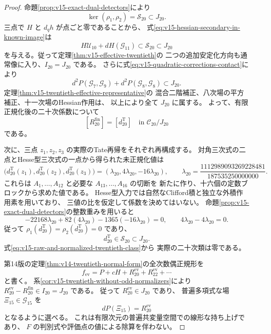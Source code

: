 \documentclass[a4paper,11pt]{ltjsarticle}
\theoremstyle{definition}
\begin{document}
\begin{proof}
命題\ref{prop:v15-exact-dual-detectors}により
\[
 \ker(\rho_1,\rho_2)=\mathcal S_{20}\subset J_{20}.
\]
三点で $H$ と $d_qh$ が点ごと零であることから、
式\eqref{eq:v15-hessian-secondary-in-known-image}は
\[
 H\mathcal U_{10}+dH(\mathcal G_{11})
       \subset\mathcal S_{20}\subset J_{20}
\]
を与える。従って定理\ref{thm:v15-effective-twentieth}の
二つの追加安定化方向も通常像に入り、$I_{20}=J_{20}$ である。
さらに式\eqref{eq:v15-quadratic-corrections-contact}により
\[
 d^2P(\mathcal G_7,\mathcal G_9)
       +d^2P(\mathcal G_8,\mathcal G_8)\subset J_{20}.
\]
定理\ref{thm:v15-twentieth-effective-representative}の
混合二階補正、八次場の平方補正、十一次場のHessian作用は、
以上により全て $J_{20}$ に属する。
よって、有限正規化後の二十次係数について
\begin{equation}\label{eq:v15-raw-and-normalized-twentieth-class}
 [R_{20}^{\mathrm{fin}}]=[d_{20}^{\mathrm T}]
           \quad\text{in }\mathcal C_{20}/J_{20}
\end{equation}
である。

次に、三点 $z_1,z_2,z_3$ の実際のTate再帰をそれぞれ再構成する。
対角三次式の二点とHesse型三次式の一点から得られた未正規化値は
\begin{equation}\label{eq:v15-three-fresh-twentieth-values}
 \bigl(d_{20}^{\mathrm T}(z_1),d_{20}^{\mathrm T}(z_2),
                d_{20}^{\mathrm T}(z_3)\bigr)
       =(\lambda_{20},4\lambda_{20},-16\lambda_{20}),
 \qquad
 \lambda_{20}=\frac{1112989093269228481}{187535250000000}.
\end{equation}
これらは $A_1,\ldots,A_{12}$ と必要な $A_{13},\ldots,A_{16}$ の切断を
新たに作り、十六個の定数ブロックから求めた値である。
Hesse型入力では自然なClifford積と独立な外積作用素を用いており、
三値の比を仮定して係数を決めてはいない。
命題\ref{prop:v15-exact-dual-detectors}の整数重みを用いると
\[
 -22168\lambda_{20}+82(4\lambda_{20})
       -1365(-16\lambda_{20})=0,\qquad
 4\lambda_{20}-4\lambda_{20}=0.
\]
従って $\rho_1(d_{20}^{\mathrm T})=\rho_2(d_{20}^{\mathrm T})=0$ であり、
\[
 d_{20}^{\mathrm T}\in\mathcal S_{20}\subset J_{20}.
\]
式\eqref{eq:v15-raw-and-normalized-twentieth-class}から
実際の二十次類は零である。

第14版の定理\ref{thm:v14-twentieth-normal-form}の全次数偶正規形を
\[
 f_{\mathrm{ev}}=P+cH+R_{20}^{\mathrm{ev}}
                       +R_{22}^{\mathrm{ev}}+\cdots
\]
と書く。
系\ref{cor:v15-twentieth-without-odd-normalizers}により
$R_{20}^{\mathrm{ev}}-R_{20}^{\mathrm{fin}}\in I_{20}=J_{20}$ である。
従って $R_{20}^{\mathrm{ev}}\in J_{20}$ であり、
普遍多項式な場 $\Xi_{15}\in\mathcal G_{15}$ を
\[
 dP(\Xi_{15})=R_{20}^{\mathrm{ev}}
\]
となるように選べる。
これは有限次元の普遍共変量空間での線形な持ち上げであり、
$F$ の判別式や評価点の値による除算を伴わない。


\end{proof}
\end{document}

